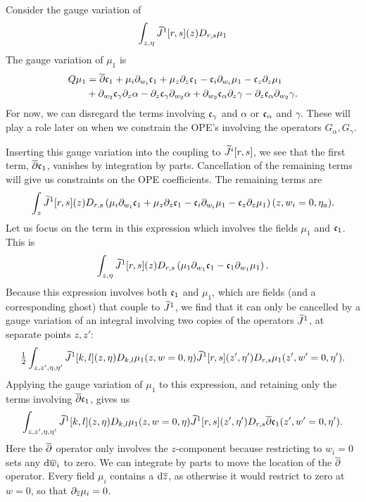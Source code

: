 \documentclass[../main.tex]{subfiles}
\begin{document}
Consider the gauge variation of 
\begin{equation}\label{eqn:j1vary}
	\int_{z,\eta} \widetilde{J}^1[r,s](z)  D_{r,s} \mu_1 
\end{equation}
The gauge variation of $\mu_1$ is
\begin{align*}
	Q \mu_1 & = \overline{\partial} \mathfrak{c}_1 + \mu_i \partial_{w_i} \mathfrak{c}_1 + \mu_z \partial_{z} \mathfrak{c}_1 - \mathfrak{c}_i \partial_{w_i} \mu_1 - \mathfrak{c}_z \partial_z \mu_1 \\
& + \partial_{w_2} \mathfrak{c}_\gamma\partial_z \alpha -  \partial_z\mathfrak{c}_\gamma \partial_{w_2} \alpha + \partial_{w_2} \mathfrak{c}_\alpha \partial_z \gamma - \partial_z \mathfrak{c}_\alpha \partial_{w_2} \gamma .
\end{align*}
For now, we can disregard the terms involving $\mathfrak{c}_\gamma$ and $\alpha$ or $\mathfrak{c}_\alpha$ and $\gamma$.
These will play a role later on when we constrain the OPE's involving the operators $G_\alpha, G_\gamma$.

Inserting this gauge variation into the coupling to $\widetilde{J}^i[r,s]$, we see that the first term, $\overline{\partial} \mathfrak{c}_1$, vanishes by integration by parts.  
Cancellation of the remaining terms will give us constraints on the OPE coefficients.
The remaining terms are 
\[ 
	\int_{z} \widetilde{J}^1[r,s] (z)  D_{r,s}\left( \mu_i \partial_{w_i} \mathfrak{c}_1 + \mu_z \partial_{z} \mathfrak{c}_1 - \mathfrak{c}_i \partial_{w_i} \mu_1 - \mathfrak{c}_z \partial_z \mu_1 \right)(z,w_i = 0, \eta_a). 
\]
Let us focus on the term in this expression which involves the fields $\mu_1$ and $\mathfrak{c}_1$. This is 
\[ 
	 \int_{z,\eta} \widetilde{J}^1[r,s] (z)  D_{r,s}\left( \mu_1 \partial_{w_1} \mathfrak{c}_1   - \mathfrak{c}_1 \partial_{w_1} \mu_1  \right). 
\]
Because this expression involves both $\mathfrak{c}_1$ and $\mu_1$, which are fields (and a corresponding ghost) that couple to $\widetilde{J}^1$, we find that it can only be cancelled by a gauge variation of an integral involving two copies of the operators $\widetilde{J}^1$, at separate points $z,z'$:  
\[ 
	\tfrac{1}{2} \int_{z,z', \eta,\eta'} \widetilde{J}^1[k,l] (z,\eta) D_{k,l} \mu_1(z, w=0, \eta)  \widetilde{J}^1[r,s] (z',\eta') D_{r,s} \mu_1(z', w' = 0, \eta') . 
\]
Applying the gauge variation of $\mu_1$ to this expression, and retaining only the terms involving $\overline{\partial} \mathfrak{c}_1$, gives us
\[ 
	\int_{z,z', \eta,\eta'} \widetilde{J}^1[k,l] (z,\eta) D_{k,l} \mu_1(z, w = 0, \eta)  \widetilde{J}^1[r,s] (z',\eta') D_{r,s} \overline{\partial} \mathfrak{c}_1 (z', w' = 0, \eta') . 
\]
Here the $\overline{\partial}$ operator only involves the $z$-component because restricting to $w_i= 0$ sets any $\mathrm{d} \overline{w}_i$ to zero. We can integrate by parts to move the location of the $\overline{\partial}$ operator. Every field $\mu_i$ contains a $\mathrm{d} {\overline{z}}$, as otherwise it would restrict to zero at $w = 0$, so that $\partial_{{\overline{z}}} \mu_i = 0$. 
\end{document}
